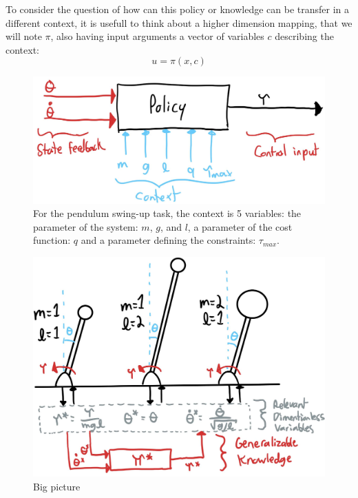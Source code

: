 To consider the question of how can this policy or knowledge can be transfer in a different context, it is usefull to think about a higher dimension mapping, that we will note $\pi$, also having input arguments a vector of variables $c$ describing the context:
\begin{equation}
u
=
\pi \left(
x,
c
\right)
\end{equation}



\begin{figure}[H]
\vspace{-5pt}
\begin{center}
\includegraphics[width=0.75\linewidth]{fig/policy_context.jpg}
\caption{For the pendulum swing-up task, the context is 5 variables: the parameter of the system: $m$, $g$, and $l$, a parameter of the cost function: $q$ and a parameter defining the constraints: $\tau_{max}$.
}\label{fig:policy_context}
\end{center}
\vspace{-5pt}
\end{figure}




\begin{figure}[t]
\vspace{-5pt}
\begin{center}
\includegraphics[width=0.99\linewidth]{fig/bigpicture2.jpg}
\caption{Big picture}\label{fig:big_picture}
\end{center}
\vspace{-15pt}
\end{figure}

